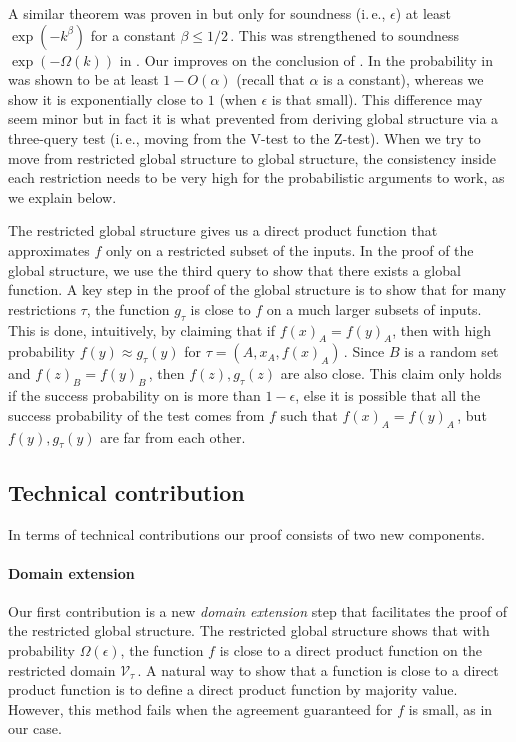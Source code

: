 \documentclass[11pt]{article}
\numberwithin{equation}{section}
\theoremstyle{definition}
\theoremstyle{plain}
\newcommand{\ie}{i.\,e.}
\newcommand\f{f} %
\newcommand\pf{g} %
\newcommand\cons{\mathcal{V}} %
\begin{document}
%
A similar theorem was proven in \cite{impagliazzo2012new} but only for soundness (\ie, $\epsilon$) at least $\exp(-k^\beta)$ for a constant $\beta \leq1/2$\,.
%
%
This was strengthened to soundness $\exp(-\Omega(k))$ in \cite{dinur2014direct}. Our  improves on the conclusion of \cite{dinur2014direct}. In \cite{dinur2014direct} the probability in  was shown to be at least $1-O(\alpha)$ 
(recall that $\alpha$ is a constant), %
%
%
whereas we show it is exponentially close to $1$ (when $\epsilon$ is that small).
This difference may seem minor but in fact it is what prevented \cite{dinur2014direct} from deriving global structure via a %
three-query   %
test (\ie, moving from the %
V-test to the Z-test). %
When we try to move from restricted global structure to global structure, the consistency inside each restriction needs to be very high for the probabilistic arguments to work, as we explain below.

The restricted global structure gives us a direct product function that approximates $\f$ only on a restricted subset of the inputs. In the proof of the global structure, we use the third query to show that there exists a global function. A key step in the proof of the global structure is to show that for many restrictions $\tau$, the function $\pf_\tau$ is close to $\f$ on a much larger subsets of inputs. This is done, intuitively, by claiming that if $\f(x)_A = \f(y)_A$, then with high probability $\f(y)\approx \pf_\tau(y)$ for $\tau=(A,x_A,\f(x)_A)$\,. Since $B$ is a random set and $\f(z)_B = \f(y)_B$\,, then $\f(z), \pf_\tau(z)$ are also close. This claim only holds if the success probability on  is more than $1-\epsilon$, else it is possible that all the success probability of the test comes from $f$ such that $\f(x)_A = \f(y)_A$\,, but $\f(y),\pf_\tau(y)$ are far from each other.


\subsection{Technical contribution}
In terms of technical contributions our proof consists of two new components.

\paragraph*{Domain extension} Our first contribution is a new \emph{domain extension} step that facilitates the proof of the restricted global structure. The restricted global structure shows that with probability $\Omega(\epsilon)$, the function $\f$ is close to a direct product function on the restricted domain $\cons_\tau$\,. A natural way to show that a function is close to a direct product function is to define a direct product function by majority value. However, this method fails when the agreement guaranteed for $\f$ is small, as in our case.
\end{document}
